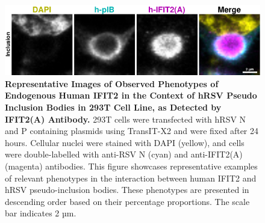 \begin{figure}
    \centering
    \includegraphics[width=1\linewidth]{09. Chapter 4/Figs/01. pIB/03. IFIT2/02. IFIT2A/03. i2a-293t-hnhp.pdf} 
    \caption[Representative Images of Observed Phenotypes of Endogenous Human IFIT2 in the Context of hRSV Pseudo Inclusion Bodies in 293T Cell Line, as Detected by IFIT2(A) Antibody.]{\textbf{Representative Images of Observed Phenotypes of Endogenous Human IFIT2 in the Context of hRSV Pseudo Inclusion Bodies in 293T Cell Line, as Detected by IFIT2(A) Antibody.} 293T cells were transfected with hRSV N and P containing plasmids using TransIT-X2 and were fixed after 24 hours. Cellular nuclei were stained with DAPI (yellow), and cells were double-labelled with anti-RSV N (cyan) and anti-IFIT2(A) (magenta) antibodies. This figure showcases representative examples of relevant phenotypes in the interaction between human IFIT2 and hRSV pseudo-inclusion bodies. These phenotypes are presented in descending order based on their percentage proportions. The scale bar indicates 2 µm.}
    \label{fig:Representative Images of Observed Phenotypes of Endogenous Human IFIT2 in the Context of hRSV Pseudo Inclusion Bodies in 293T Cell Line, as Detected by IFIT2(A) Antibody}
\end{figure}

